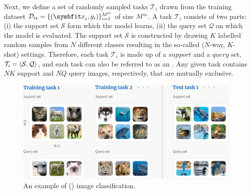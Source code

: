Next, we define a set of randomly sampled tasks $\mathcal{T}_i$ drawn from the training dataset $\mathcal{D}_{\textup{tr}} = \{({\symbfit x}_i, y_i)\}_{i = 1}^{M^\textup{tr}}$ of size $M^\textup{tr}$. A task $\mathcal{T}_i$ consists of two parts: (i) the support set $\mathcal{S}$ form which the model learns, (ii) the query set $\mathcal{Q}$ on which the model is evaluated. The support set $\mathcal{S}$ is constructed by drawing $K$ labelled random samples from $N$ different classes resulting in the so-called ($N$-way, $K$-shot) settings.
Therefore, each task $\mathcal{T}_i$ is made up of a $\textit{support}$ and a $\textit{query}$ set, $\mathcal{T}_i=\langle \mathcal{S}, \mathcal{Q} \rangle$, and each task can also be referred to as an . Any given task contains $NK$ support and $NQ$ query images, respectively, that are mutually exclusive.
\begin{figure}[ht]
    \centering
    \captionsetup{justification=centering}
    \includegraphics[width=\linewidth]{chapters/assets/fsl/n3k2.png}
    \caption{An example of () image classification.}
    \label{fig:fsl-tasks}
\end{figure}

